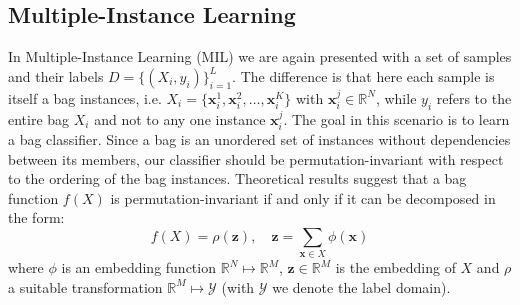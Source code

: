 \documentclass[journal,twoside,web]{ieeecolor}
\begin{document}
\subsection{Multiple-Instance Learning}
In Multiple-Instance Learning (MIL) we are again presented with a set of samples
and their labels $D = \{ (X_i, y_i) \}_{i=1}^L$. The difference is that here
each sample is itself a bag instances, i.e.
$X_i=\{\mathbf{x}_i^1, \mathbf{x}_i^2, \dots, \mathbf{x}_i^K\}$  with
$\mathbf{x}_i^j \in \mathbb{R}^N$, while $y_i$ refers to the entire bag
$X_i$ and not to any one  instance $\mathbf{x}_i^j$. 
The goal in this scenario is to learn a bag classifier.
Since a bag is an unordered set of instances without dependencies
between its members, our classifier should be
permutation-invariant
with respect to the ordering of the bag instances.
Theoretical results \cite{zaheer2017} suggest that 
a bag function $f(X)$ is permutation-invariant if and only if
it can be decomposed in the form:
\begin{equation}
f(X) = \rho\left(\mathbf{z}\right),  \quad \mathbf{z} = \sum_{\mathbf{x} \in X} \phi(\mathbf{x})
\label{eq:sum_decomp}
\end{equation}
where $\phi$ is an embedding function $\mathbb{R}^N \mapsto \mathbb{R}^M$,
$\mathbf{z} \in \mathbb{R}^M$ is the embedding of $X$ and
$\rho$ a suitable transformation $\mathbb{R}^M \mapsto \mathcal{Y}$ (with
$\mathcal{Y}$ we denote the label domain).
\end{document}
